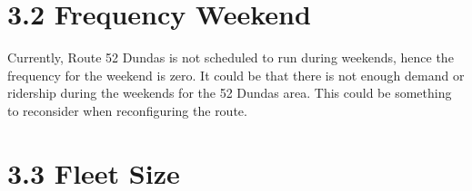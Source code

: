 \documentclass[
11pt, %
oneside, %
english, %
singlespacing, %
]{macthesis} %
\begin{document}
\hypertarget{frequency-weekend}{%
\section{3.2 Frequency Weekend}\label{frequency-weekend}}

Currently, Route 52 Dundas is not scheduled to run during weekends, hence the frequency for the weekend is zero. It could be that there is not enough demand or ridership during the weekends for the 52 Dundas area. This could be something to reconsider when reconfiguring the route.

\hypertarget{fleet-size}{%
\section{3.3 Fleet Size}\label{fleet-size}}
\end{document}
